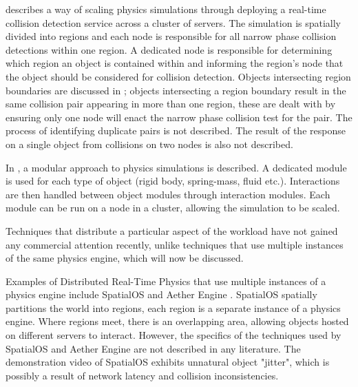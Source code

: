 \cite{Morgan2005} describes a way of scaling physics simulations through deploying a real-time collision detection service across a cluster of servers. The simulation is spatially divided into regions and each node is responsible for all narrow phase collision detections within one region. A dedicated node is responsible for determining which region an object is contained within and informing the region's node that the object should be considered for collision detection.
Objects intersecting region boundaries are discussed in \cite{Morgan2005}; objects intersecting a region boundary result in the same collision pair appearing in more than one region, these are dealt with by ensuring only one node will enact the narrow phase collision test for the pair. The process of identifying duplicate pairs is not described. The result of the response on a single object from collisions on two nodes is also not described.


In \cite{allard2006distributed}, a modular approach to physics simulations is described. A dedicated module is used for each type of object (rigid body, spring-mass, fluid etc.). Interactions are then handled between object modules through interaction modules. Each module can be run on a node in a cluster, allowing the simulation to be scaled.

Techniques that distribute a particular aspect of the workload have not gained any commercial attention recently, unlike techniques that use multiple instances of the same physics engine, which will now be discussed.

Examples of Distributed Real-Time Physics that use multiple instances of a physics engine include SpatialOS \cite{SpatialOS} and Aether Engine \cite{AetherEngine}. SpatialOS spatially partitions the world into regions, each region is a separate instance of a physics engine. Where regions meet, there is an overlapping area, allowing objects hosted on different servers to interact. However, the specifics of the techniques used by SpatialOS and Aether Engine are not described in any literature. The demonstration video of SpatialOS exhibits unnatural object "jitter", which is possibly a result of network latency and collision inconsistencies.

